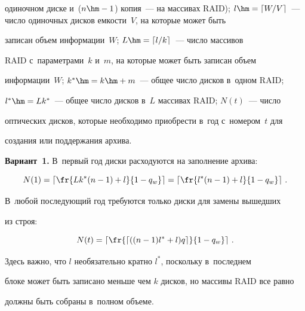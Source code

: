 одиночном диске и~($n\hm-1$) копия~--- на массивах RAID); $l\hm= \lceil 


W/V\rceil$~--- число одиночных дисков емкости~$V$, на которые может быть 


записан объем информации~$W$; $L\hm= \lceil l/k\rceil$~--- число массивов 


RAID с~параметрами~$k$ и~$m$, на которые может быть записан объем 


информации~$W$; $k^* \hm= k \hm+ m$~--- общее число дисков в~одном RAID; 


$l^*\hm = Lk^*$~--- общее число дисков в~$L$ массивах RAID; $N(t)$~--- число 


оптических дисков, которые необходимо приобрести в~год с~номером~$t$ для 


создания или поддержания архива.





\smallskip


  


  \noindent


  \textbf{Вариант~1.} В~первый год диски расходуются на заполнение архива:


  $$


  N(1)=\left \lceil \fr{Lk^*(n-1)+l}{1-q_w}\right\rceil = \left\lceil \fr{l^*(n-1)+l}{1-


q_w}\right\rceil\,.


  $$


  


  В~любой последующий год требуются только диски для замены вышедших 


из строя:


  \begin{equation}


  N(t)= \left\lceil \fr{\lceil ((n-1)l^*+l)q \rceil}{1-q_w}\right\rceil\,.


  \label{e1-che}


  \end{equation}


    Здесь важно, что $l$ необязательно кратно $l^*$, поскольку в~последнем 


блоке может быть записано меньше чем $k$ дисков, но массивы RAID все равно 


должны быть собраны в~полном объеме.





\smallskip


